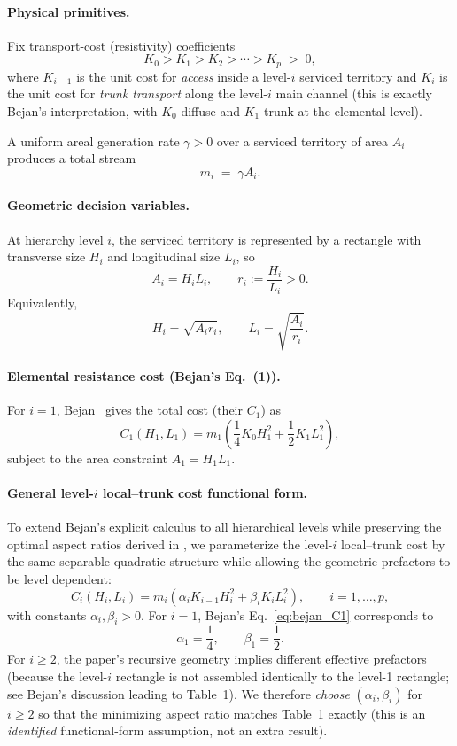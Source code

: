 \documentclass[12pt]{article}
\theoremstyle{plain}
\theoremstyle{definition}
\theoremstyle{remark}
\begin{document}
\paragraph{Physical primitives.}
Fix transport-cost (resistivity) coefficients
\[
K_0 > K_1 > K_2 > \cdots > K_p \;>\;0,
\]
where $K_{i-1}$ is the unit cost for \emph{access} inside a level-$i$ serviced
territory and $K_i$ is the unit cost for \emph{trunk transport} along the
level-$i$ main channel (this is exactly Bejan’s interpretation, with $K_0$
diffuse and $K_1$ trunk at the elemental level).

A uniform areal generation rate $\gamma>0$ over a serviced territory of area
$A_i$ produces a total stream
\[
m_i \;=\; \gamma A_i.
\]

\paragraph{Geometric decision variables.}
At hierarchy level $i$, the serviced territory is represented by a rectangle
with transverse size $H_i$ and longitudinal size $L_i$, so
\[
A_i = H_i L_i,
\qquad
r_i := \frac{H_i}{L_i} >0.
\]
Equivalently,
\[
H_i=\sqrt{A_i r_i},\qquad L_i=\sqrt{\frac{A_i}{r_i}}.
\]

\paragraph{Elemental resistance cost (Bejan’s Eq.~(1)).}
For $i=1$, Bejan~\cite{BejanBadescuDeVos2000ECM} gives the total cost (their $C_1$) as
\begin{equation}
C_1(H_1,L_1)
=
m_1\left(\frac14 K_0 H_1^2 + \frac12 K_1 L_1^2\right),
\label{eq:bejan_C1}
\end{equation}
subject to the area constraint $A_1=H_1L_1$.

\paragraph{General level-$i$ local--trunk cost functional form.}
To extend Bejan’s explicit calculus to all hierarchical levels while
preserving the optimal aspect ratios derived in
\cite{BejanBadescuDeVos2000AE},
we parameterize the level-$i$ local--trunk cost by the same separable
quadratic structure while allowing the geometric prefactors to be
level dependent:
\begin{equation}
C_i(H_i,L_i)
=
m_i\left(\alpha_i K_{i-1} H_i^2 + \beta_i K_i L_i^2\right),
\qquad i=1,\dots,p,
\label{eq:Ci_alpha_beta}
\end{equation}
with constants $\alpha_i,\beta_i>0$.
For $i=1$, Bejan’s Eq.~\eqref{eq:bejan_C1} corresponds to
\[
\alpha_1=\frac14,\qquad \beta_1=\frac12.
\]
For $i\ge 2$, the paper’s recursive geometry implies different effective
prefactors (because the level-$i$ rectangle is not assembled identically to
the level-1 rectangle; see Bejan’s discussion leading to Table~1).
We therefore \emph{choose} $(\alpha_i,\beta_i)$ for $i\ge2$ so that the
minimizing aspect ratio matches Table~1 exactly (this is an \emph{identified}
functional-form assumption, not an extra result).
\end{document}
